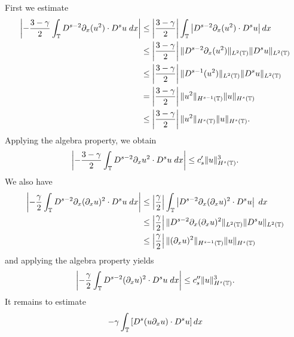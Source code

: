 		First we estimate
	\begin{equation}
		\begin{split}
			\left | - \frac{3 -\gamma}{2} \int_{\mathbb{T}} D^{s-2} \partial_x (u^2) \cdot
			D^s u \; dx \right |
			& \le \left | \frac{3 -\gamma}{2} \right |
			\int_{\mathbb{T}} \left |
			D^{s-2} \partial_x (u^2) \cdot D^s u \right | dx 
			\\
			& \le \left | \frac{3 -\gamma}{2} \right |
			\|D^{s-2} \partial_x (u^2) \|_{L^2(\mathbb{T})} 
			\|D^s u \|_{L^2(\mathbb{T})}
			\\
			& \le \left | \frac{3 -\gamma}{2} \right |
			\|D^{s-1} (u^2) \|_{L^2(\mathbb{T})} 
			\|D^s u \|_{L^2(\mathbb{T})}
			\\
			& = \left | \frac{3 -\gamma}{2} \right |
			\| u^2 \|_{H^{s-1}(\mathbb{T})} \| u \|_{H^s(\mathbb{T})}
			\\
			& \le
			\left | \frac{3 -\gamma}{2} \right | \| u^2 \|_{H^s(\mathbb{T})} \| u
			\|_{H^s(\mathbb{T})}.
		\end{split}
	\end{equation}
	Applying the algebra property, we obtain
	\begin{equation}
		\label{hl1-prime}
		\begin{split}
			\left | -\frac{3 -\gamma}{2} \int_{\mathbb{T}} D^{s-2} \partial_x u^2 \cdot
			D^s u \; dx \right |
			\le c_s' \| u \|_{H^s(\mathbb{T})}^3.
		\end{split}
	\end{equation}
	We also have
	\begin{equation}
		\begin{split}
			\left | -\frac{\gamma}{2} \int_{\mathbb{T}} D^{s-2} \partial_x (\partial_x u)^2 \cdot
			D^s u \; dx \right |
			& \le \left | \frac{\gamma}{2} \right |
			\int_{\mathbb{T}} \left | D^{s-2} \partial_x (\partial_x u)^2 
			\cdot D^s u \right | \; dx
			\\
			& \le \left | \frac{\gamma}{2} \right |
			\| D^{s-2} \partial_x (\partial_x u)^2 \|_{L^2(\mathbb{T})}
			\| D^s u \|_{L^2(\mathbb{T})}
			\\
			&  \le \left | \frac{\gamma}{2} \right | \|(\partial_x u)^2
			\|_{H^{s-1}(\mathbb{T})} \| u \|_{H^s(\mathbb{T})} 
		\end{split}
	\end{equation}
	and applying the algebra property yields
	\begin{equation}
		\label{hl2-prime}
		\left | -\frac{\gamma}{2} \int_{\mathbb{T}} D^{s-2} (\partial_x u)^2 \cdot
		D^s u \; dx \right |
		\le c_s'' \|u\|_{H^s(\mathbb{T})}^3.
	\end{equation}
	It remains to estimate 
	\begin{equation*}
		- \gamma \int_{\mathbb{T}} \left [  D^s (u \partial_x u) \cdot
		D^s u \right ]  dx
	\end{equation*}

